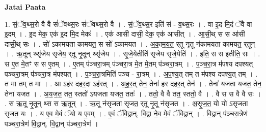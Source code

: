 \documentclass[17pt]{extarticle}
\begin{document}
\textbf{Jatai Paata} \newline

1. सं॒ॅव॒थ्स॒रो वै वै सं॑ॅवथ्स॒रः सं॑ॅवथ्स॒रो वै । . सं॒ॅव॒थ्स॒र इति॑ सं - व॒थ्स॒रः । . वा इ॒द मि॒दं ॅवै वा इ॒दम् । . इ॒द मेक॒ एक॑ इ॒द मि॒द मेकः॑ । . एक॑ आसी दासी॒ देक॒ एक॑ आसीत् । . आ॒सी॒थ् स स आ॑सी दासी॒थ् सः । . सो॑ ऽकामयता कामयत॒ स सो॑ ऽकामयत । . अ॒का॒म॒य॒त॒ र्‌तू नृ॒तू न॑कामयता कामयत॒ र्‌तून् । . ऋ॒तून् थ्सृ॑जेय सृजेय॒ र्‌तू नृ॒तून् थ्सृ॑जेय । . सृ॒जे॒येतीति॑ सृजेय सृजे॒येति॑ । . इति॒ स स इतीति॒ सः । . स ए॒त मे॒तꣳ स स ए॒तम् । . ए॒तम् प॑ञ्चरा॒त्रम् प॑ञ्चरा॒त्र मे॒त मे॒तम् प॑ञ्चरा॒त्रम् । . प॒ञ्च॒रा॒त्र म॑पश्य दपश्यत् पञ्चरा॒त्रम् प॑ञ्चरा॒त्र म॑पश्यत् । . प॒ञ्च॒रा॒त्रमिति॑ पञ्च - रा॒त्रम् । . अ॒प॒श्य॒त् तम् त म॑पश्य दपश्य॒त् तम् । . त मा तम् त मा । . आ ऽह॑र दहर॒दा ऽह॑रत् । . अ॒ह॒र॒त् तेन॒ तेना॑ हर दहर॒त् तेन॑ । . तेना॑ यजता यजत॒ तेन॒ तेना॑ यजत । . अ॒य॒ज॒त॒ तत॒ स्ततो॑ ऽयजता यजत॒ ततः॑ । . ततो॒ वै वै तत॒ स्ततो॒ वै । . वै स स वै वै सः । . स ऋ॒तू नृ॒तून् थ्स स ऋ॒तून् । . ऋ॒तू न॑सृजता सृजत॒ र्‌तू नृ॒तू न॑सृजत । . अ॒सृ॒ज॒त॒ यो यो॑ ऽसृजता सृजत॒ यः । . य ए॒व मे॒वं ॅयो य ए॒वम् । . ए॒वं ॅवि॒द्वान्. वि॒द्वा ने॒व मे॒वं ॅवि॒द्वान् । . वि॒द्वान् प॑ञ्चरा॒त्रेण॑ पञ्चरा॒त्रेण॑ वि॒द्वान्. वि॒द्वान् प॑ञ्चरा॒त्रेण॑ । \newline
\end{document}
